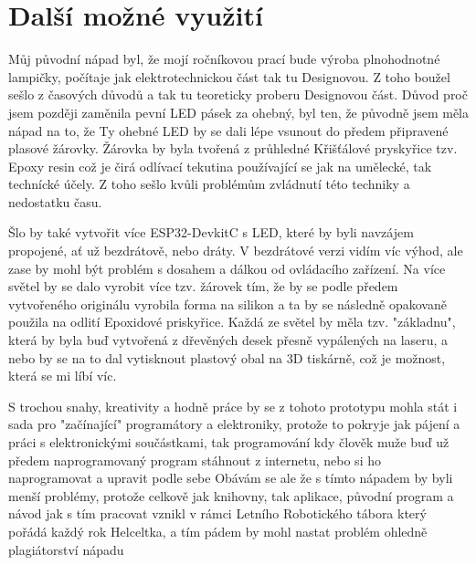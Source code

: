 \chapter{Další možné využití}

Můj původní nápad byl, že mojí ročníkovou prací bude výroba plnohodnotné lampičky, počítaje jak elektrotechnickou část tak tu Designovou. Z toho boužel sešlo z časových důvodů a tak tu teoreticky proberu Designovou část. 
Důvod proč jsem později zaměnila pevní LED pásek za ohebný, byl ten, že původně jsem měla nápad na to, že Ty ohebné LED by se dali lépe vsunout do předem připravené plasové žárovky. Žárovka by byla tvořená z průhledné Křišťálové pryskyřice tzv. Epoxy resin\cite{epoxyresin} což je čirá odlívací tekutina používající se jak na umělecké, tak technícké účely. Z toho sešlo kvůli problémům zvládnutí této techniky a nedostatku času. %


Šlo by také vytvořit více ESP32-DevkitC s LED, které by byli navzájem propojené, ať už bezdrátově, nebo dráty. V bezdrátové verzi vidím víc výhod, ale zase by mohl být problém s dosahem a dálkou od ovládacího zařízení. 
Na více světel by se dalo vyrobit více tzv. žárovek tím, že by se podle předem vytvořeného originálu vyrobila forma na silikon a ta by se následně opakovaně použila na odlití Epoxidové priskyřice. Každá ze světel by měla tzv. "základnu", která by byla buď vytvořená z dřevěných desek přesně vypálených na laseru, a nebo by se na to dal vytisknout plastový obal na 3D tiskárně, což je možnost, která se mi líbí víc. 
	

S trochou snahy, kreativity a hodně práce by se z tohoto prototypu mohla stát i sada pro "začínající" programátory a elektroniky, protože to pokryje jak pájení a práci s elektronickými součástkami, tak programování kdy člověk muže buď už předem naprogramovaný program stáhnout z internetu, nebo si ho naprogramovat a upravit podle sebe Obávám se ale že s tímto nápadem by byli menší problémy, protože celkově jak knihovny, tak aplikace, původní program a návod jak s tím pracovat vznikl v rámci Letního Robotického tábora který pořádá každý rok Helceltka, a tím pádem by mohl nastat problém ohledně plagiátorství nápadu 


